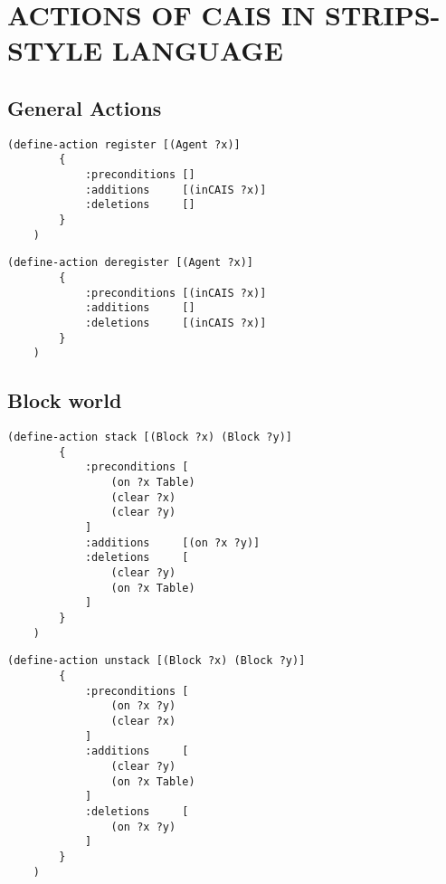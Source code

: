 
\appendix    %

\chapter{ACTIONS OF CAIS IN STRIPS-STYLE LANGUAGE}\label{apdx:strips}

\section{General Actions}

\begin{lstlisting}[caption=register]
    (define-action register [(Agent ?x)]
        {
            :preconditions []
            :additions     [(inCAIS ?x)]
            :deletions     []
        }
    )
\end{lstlisting}

\begin{lstlisting}[caption=deregister]
    (define-action deregister [(Agent ?x)]
        {
            :preconditions [(inCAIS ?x)]
            :additions     []
            :deletions     [(inCAIS ?x)]
        }
    )
\end{lstlisting}

\section{Block world}

\begin{lstlisting}[caption=stack]
    (define-action stack [(Block ?x) (Block ?y)]
        {
            :preconditions [
                (on ?x Table)
                (clear ?x)
                (clear ?y)
            ]
            :additions     [(on ?x ?y)]
            :deletions     [
                (clear ?y)
                (on ?x Table)
            ]
        }
    )
\end{lstlisting}

\begin{lstlisting}[caption=unstack]
    (define-action unstack [(Block ?x) (Block ?y)]
        {
            :preconditions [
                (on ?x ?y)
                (clear ?x)
            ]
            :additions     [
                (clear ?y)
                (on ?x Table)
            ]
            :deletions     [
                (on ?x ?y)
            ]
        }
    )
\end{lstlisting}

